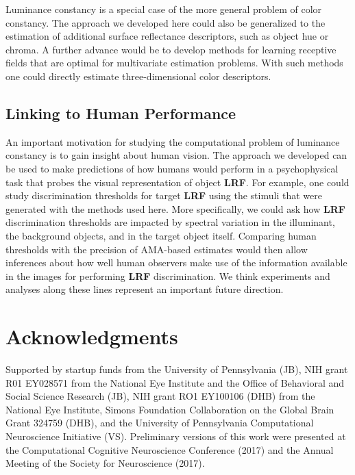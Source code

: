 \documentclass{jov}
\providecommand{\DIFaddtex}[1]{{\bf #1}} %
\providecommand{\DIFdeltex}[1]{} %
\providecommand{\DIFaddbegin}{} %
\providecommand{\DIFaddend}{} %
\providecommand{\DIFdelbegin}{} %
\providecommand{\DIFdelend}{} %
\providecommand{\DIFadd}[1]{\texorpdfstring{\DIFaddtex{#1}}{#1}} %
\providecommand{\DIFdel}[1]{\texorpdfstring{\DIFdeltex{#1}}{}} %
\newcommand{\DIFscaledelfig}{0.5}
\newlength{\DIFdelgraphicswidth} %
\newlength{\DIFdelgraphicsheight} %
\newcommand{\DIFaddincludegraphics}[2][]{{\color{blue}\fbox{\DIFOincludegraphics[#1]{#2}}}} %
\newcommand{\DIFdelincludegraphics}[2][]{%
\sbox{\DIFdelgraphicsbox}{\DIFOincludegraphics[#1]{#2}}%
\settoboxwidth{\DIFdelgraphicswidth}{\DIFdelgraphicsbox} %
\settoboxtotalheight{\DIFdelgraphicsheight}{\DIFdelgraphicsbox} %
\scalebox{\DIFscaledelfig}{%
\parbox[b]{\DIFdelgraphicswidth}{\usebox{\DIFdelgraphicsbox}\\[-\baselineskip] \rule{\DIFdelgraphicswidth}{0em}}\llap{\resizebox{\DIFdelgraphicswidth}{\DIFdelgraphicsheight}{%
\setlength{\unitlength}{\DIFdelgraphicswidth}%
\begin{picture}(1,1)%
\thicklines\linethickness{2pt} %
{\color[rgb]{1,0,0}\put(0,0){\framebox(1,1){}}}%
{\color[rgb]{1,0,0}\put(0,0){\line( 1,1){1}}}%
{\color[rgb]{1,0,0}\put(0,1){\line(1,-1){1}}}%
\end{picture}%
}\hspace*{3pt}}} %
} %
\DeclareRobustCommand{\DIFaddbegin}{\DIFOaddbegin \let\includegraphics\DIFaddincludegraphics} %
\DeclareRobustCommand{\DIFaddend}{\DIFOaddend \let\includegraphics\DIFOincludegraphics} %
\DeclareRobustCommand{\DIFdelbegin}{\DIFOdelbegin \let\includegraphics\DIFdelincludegraphics} %
\DeclareRobustCommand{\DIFdelend}{\DIFOaddend \let\includegraphics\DIFOincludegraphics} %
\begin{document}
\DIFaddend Luminance constancy is a special case of the more general problem of color constancy.
The approach we developed here could also be generalized to the estimation of additional surface reflectance descriptors, such as object hue or chroma.
A further advance would be to develop methods for learning receptive fields that are optimal for multivariate estimation problems. 
With such methods one could directly estimate three-dimensional color descriptors.

\subsection{Linking to Human Performance}

An important motivation for studying the computational problem of luminance constancy is to gain insight about human vision.
The approach we developed can be used to make predictions of how humans would perform in a psychophysical task that probes the visual representation of object \DIFdelbegin \DIFdel{LRV}\DIFdelend \DIFaddbegin \DIFadd{LRF}\DIFaddend .
For example, one could study discrimination thresholds for target \DIFdelbegin \DIFdel{LRV }\DIFdelend \DIFaddbegin \DIFadd{LRF }\DIFaddend using the stimuli that were generated with the methods used here.
More specifically, we could ask how \DIFdelbegin \DIFdel{LRV }\DIFdelend \DIFaddbegin \DIFadd{LRF }\DIFaddend discrimination thresholds are impacted by spectral variation in the illuminant, the background objects, and in the target object itself.
Comparing human thresholds with the precision of AMA-based estimates would then allow inferences about how well human observers make use of the information available in the images for performing \DIFdelbegin \DIFdel{LRV }\DIFdelend \DIFaddbegin \DIFadd{LRF }\DIFaddend discrimination.
We think experiments and analyses along these lines represent an important future direction.

\section{Acknowledgments} \label{Acknowledgments}

Supported by startup funds from the University of Pennsylvania (JB), NIH grant R01 EY028571 from the National Eye Institute and the Office of Behavioral and Social Science Research (JB), NIH grant RO1 EY100106 (DHB) from the National Eye Institute, Simons Foundation Collaboration on the Global Brain Grant 324759 (DHB), and the University of Pennsylvania Computational Neuroscience Initiative (VS).  Preliminary versions of this work were presented at the Computational Cognitive Neuroscience Conference (2017) and the Annual Meeting of the Society for Neuroscience (2017).



\end{document}
